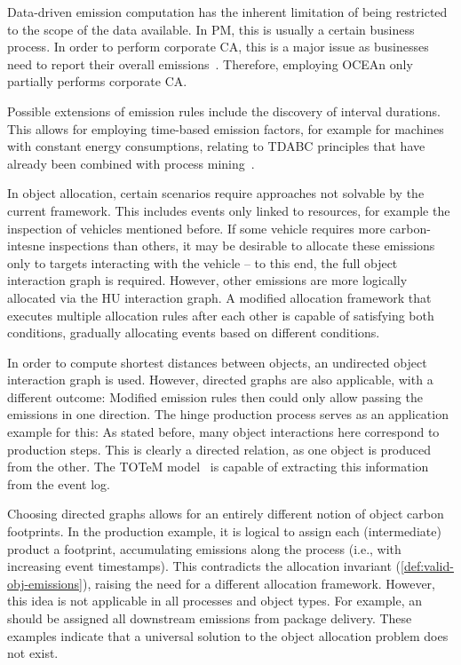 Data-driven emission computation has the inherent limitation of being restricted to the scope of the data available. 
In PM, this is usually a certain business process.
In order to perform corporate CA, this is a major issue as businesses need to report their overall emissions~\cite{Brehm22process}.
Therefore, employing OCEAn only partially performs corporate CA.

Possible extensions of emission rules include the discovery of interval durations.
This allows for employing time-based emission factors, for example for machines with constant energy consumptions, relating to TDABC principles that have already been combined with process mining~\cite{Riesener21time,Halaska21tdabc}.

In object allocation, certain scenarios require approaches not solvable by the current framework. This includes events only linked to resources, for example the inspection of vehicles mentioned before.
If some vehicle requires more carbon-intesne inspections than others, it may be desirable to allocate these emissions only to targets interacting with the vehicle -- to this end, the full object interaction graph is required.
However, other emissions are more logically allocated via the HU interaction graph.
A modified allocation framework that executes multiple allocation rules after each other is capable of satisfying both conditions, gradually allocating events based on different conditions.

In order to compute shortest distances between objects, an undirected object interaction graph is used. However, directed graphs are also applicable, with a different outcome: Modified emission rules then could only allow passing the emissions in one direction. The hinge production process serves as an application example for this: As stated before, many object interactions here correspond to production steps. This is clearly a directed relation, as one object is produced from the other. The TOTeM model~\cite{Liss24totem} is capable of extracting this information from the event log.

Choosing directed graphs allows for an entirely different notion of object carbon footprints. In the production example, it is logical to assign each (intermediate) product a footprint, accumulating emissions along the process (i.e., with increasing event timestamps). This contradicts the allocation invariant (\cref{def:valid-obj-emissions}), raising the need for a different allocation framework.
However, this idea is not applicable in all processes and object types.
For example, an  should be assigned all downstream emissions from package delivery.
These examples indicate that a universal solution to the object allocation problem does not exist.

